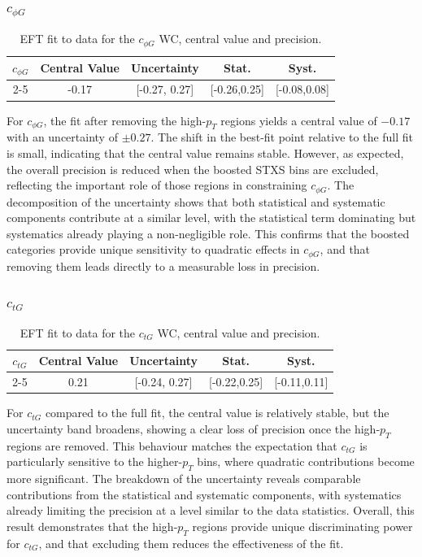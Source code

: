 \subsubsection{$c_{\phi G}$}
\begin{table}[h!]
\centering
\begin{tabular}{|c|c|c|c|c|}
\hline
\multirow{2}{*}{\textbf{$c_{\phi G}$}} & \textbf{Central Value} & \textbf{Uncertainty} &\textbf{Stat.}&\textbf{Syst.}\\
\cline{2-5}
& -0.17 & [-0.27, 0.27] & [-0.26,0.25]
&[-0.08,0.08]
\\
\hline
\end{tabular}

    \caption{EFT fit to data for the $c_{\phi G}$ WC, central value and precision.}
    \label{tab:c_tG_Quad}
\end{table}
For $c_{\phi G}$, the fit after removing the high-$p_{T}$ regions yields a central value of $-0.17$ with an uncertainty of $\pm 0.27$. The shift in the best-fit point relative to the full fit is small, indicating that the central value remains stable. However, as expected, the overall precision is reduced when the boosted STXS bins are excluded, reflecting the important role of those regions in constraining $c_{\phi G}$. The decomposition of the uncertainty shows that both statistical and systematic components contribute at a similar level, with the statistical term dominating but systematics already playing a non-negligible role. This confirms that the boosted categories provide unique sensitivity to quadratic effects in $c_{\phi G}$, and that removing them leads directly to a measurable loss in precision.
\subsubsection{$c_{tG}$}
\begin{table}[h!]
\centering
\begin{tabular}{|c|c|c|c|c|}
\hline
\multirow{2}{*}{\textbf{$c_{t G}$}} & \textbf{Central Value} & \textbf{Uncertainty} &\textbf{Stat.}&\textbf{Syst.}\\
\cline{2-5}
& 0.21 & [-0.24, 0.27] & [-0.22,0.25]
&[-0.11,0.11]
\\
\hline
\end{tabular}

    \caption{EFT fit to data for the $c_{t G}$ WC, central value and precision.}
    \label{tab:c_tG_Quad}
\end{table}
For $c_{tG}$ compared to the full fit, the central value is relatively stable, but the uncertainty band broadens, showing a clear loss of precision once the high-$p_T$ regions are removed. This behaviour matches the expectation that $c_{tG}$ is particularly sensitive to the higher-$p_{T}$ bins, where quadratic contributions become more significant. The breakdown of the uncertainty reveals comparable contributions from the statistical and systematic components, with systematics already limiting the precision at a level similar to the data statistics. Overall, this result demonstrates that the high-$p_T$ regions provide unique discriminating power for $c_{tG}$, and that excluding them reduces the effectiveness of the fit.

